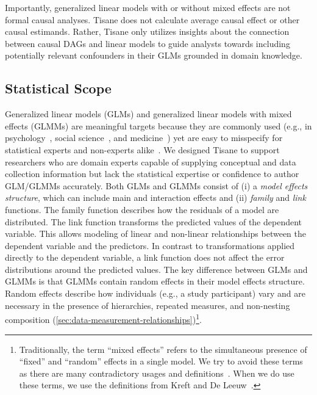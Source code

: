 Importantly, generalized linear models with or without mixed effects are not
formal causal analyses. Tisane does not calculate average causal effect or other
causal estimands. Rather, Tisane only utilizes insights about the connection
between causal DAGs and linear models to guide analysts towards including
potentially relevant confounders in their GLMs grounded in domain knowledge. 


\subsection{Statistical Scope}  \label{sec:GLM}

Generalized linear models (GLMs) and generalized linear models with mixed
effects (GLMMs) are meaningful targets because they are commonly used (e.g., in
psychology~\cite{lo2015transform,cohen2013applied}, social
science~\cite{kreft1998introducing}, and
medicine~\cite{bolker2009generalized,barr2013random}) yet are easy to misspecify
for statistical experts and non-experts alike~\cite{barr2013random,
cohen2013applied}. We designed Tisane to support researchers who are domain
experts capable of supplying conceptual and data collection information but lack
the statistical expertise or confidence to author GLM/GLMMs accurately.
Both GLMs and GLMMs consist of (i) a \textit{model effects structure},
which can include main and interaction effects and (ii) \textit{family} and
\textit{link} functions. The family function describes how the residuals of a
model are distributed. The link function transforms the predicted values of the
dependent variable. This allows modeling of linear and non-linear relationships
between the dependent variable and the predictors. In contrast to
transformations applied directly to the dependent variable, a link function does
not affect the error distributions around the predicted values. The key
difference between GLMs and GLMMs is that GLMMs contain random effects in their
model effects structure. Random effects describe how individuals (e.g., a study
participant) vary and are necessary in the presence of hierarchies, repeated
measures, and non-nesting composition
(\autoref{sec:data-measurement-relationships})\footnote{Traditionally, the term
``mixed effects'' refers to the simultaneous presence of ``fixed'' and
``random'' effects in a single model. We try to avoid these terms as there are
many contradictory usages and definitions~\cite{gelmanFixedRandom}. When we do
use these terms, we use the definitions from Kreft and De
Leeuw~\cite{kreft1998introducing}.}.

